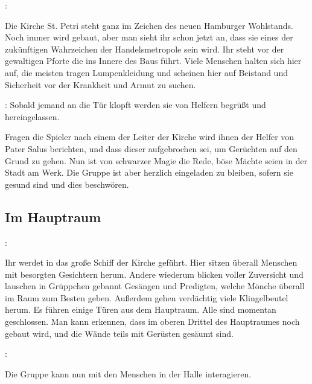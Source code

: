 
:

Die Kirche St. Petri steht ganz im Zeichen des neuen Hamburger Wohlstands. Noch immer wird gebaut, aber man sieht ihr schon jetzt an, dass sie eines der zukünftigen Wahrzeichen der Handelsmetropole sein wird. Ihr steht vor der gewaltigen Pforte die ins Innere des Baus führt. Viele Menschen halten sich hier auf, die meisten tragen Lumpenkleidung und scheinen hier auf Beistand und Sicherheit vor der Krankheit und Armut zu suchen.

: Sobald jemand an die Tür klopft werden sie von Helfern begrüßt und hereingelassen.



Fragen die Spieler nach einem der Leiter der Kirche wird ihnen der Helfer von Pater Salus berichten, und dass dieser aufgebrochen sei, um Gerüchten auf den Grund zu gehen.
Nun ist von schwarzer Magie die Rede, böse Mächte seien in der Stadt am Werk. Die Gruppe ist aber herzlich eingeladen zu bleiben, sofern sie gesund sind und dies beschwören.

\subsection*{Im Hauptraum}
\label{hauptraum}

:

Ihr werdet in das große Schiff der Kirche geführt. Hier sitzen überall Menschen mit besorgten Gesichtern herum. Andere wiederum blicken voller Zuversicht und lauschen in Grüppchen gebannt Gesängen und Predigten, welche Mönche überall im Raum zum Besten geben. Außerdem gehen verdächtig viele Klingelbeutel herum. Es führen einige Türen aus dem Hauptraum. Alle sind momentan geschlossen. Man kann erkennen, dass im oberen Drittel des Hauptraumes noch gebaut wird, und die Wände teils mit Gerüsten gesäumt sind.

:

Die Gruppe kann nun mit den Menschen in der Halle interagieren.

